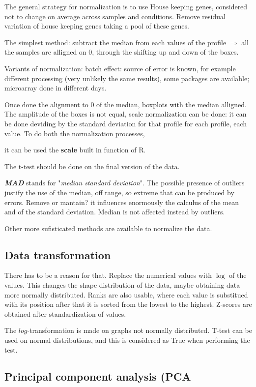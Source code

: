 The general strategy for normalization is to use
House keeping genes,
considered not to change on average across samples and
conditions. Remove residual variation of house keeping genes taking a pool of these genes.

The simplest method: subtract the median from each values of the profile $\Rightarrow$ all the samples are alligned on  $0$, through the shifting up and down of the boxes. 

Variants of normalization: batch effect: source of error is known, for example different processing (very unlikely the same results), some packages are available; microarray done in different days.

Once done the alignment to 0 of the median, boxplots with the median alligned. The amplitude of the boxes is not equal, scale normalization can be done: it can be done deviding by the standard deviation for that profile for each profile, each value. To do both the normalization processes, 

it can be used the \textbf{scale} built in function of R.  

The t-test should be done on the final version of the data. 

\textbf{\textit{MAD}} stands for "\textit{median standard deviation}". The possible presence of outliers justify the use of the median, off range, so extreme that can be produced by errors. Remove or mantain? it influences enormously the calculus of the mean and of the standard deviation. Median is not affected instead by outliers.

Other more sufisticated methods are available to normalize the data. 

\subsection{Data transformation}
There has to be a reason for that.
Replace the numerical values with $ \log $ of the values. This changes the shape distribution of the data, maybe obtaining data more normally distributed. Ranks are also usable, where each value is substitued with its position after that it is sorted from the lowest to the highest.
Z-scores are obtained after standardization of values.

The $ log $-transformation is made on graphs not normally distributed. T-test can be used on normal distributions, and this is considered as True when performing the test.

\subsection{Principal component analysis (PCA}

